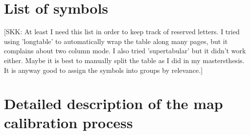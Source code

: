 \documentclass{aa}
\newcommand{\skk}[1]{\textcolor{midorange}{[SKK: #1]}} %
\begin{document}



\appendix
\FloatBarrier

\section{List of symbols} \label{sect:sym}

\skk{At least I need this list in order to keep track of reserved letters. I tried using 'longtable' to automatically 
wrap the table along many pages, but it complains about two column mode. I also tried 'supertabular' but it didn't work 
either. Maybe it is best to manually split the table as I did in my mastersthesis. It is anyway good to assign the 
symbols into groups by relevance.}
\setlength{\extrarowheight}{3pt}
\def\tabularxcolumn#1{m{#1}}
\newcommand{\symtable}[2]{\begin{table} \caption{#1} \begin{tabularx}{\textwidth}{lX} #2 \end{tabularx} \end{table}}


\FloatBarrier

\section{Detailed description of the map calibration process} \label{sect:detailed_calib}


\begin{acknowledgements}
\end{acknowledgements}
\end{document}
